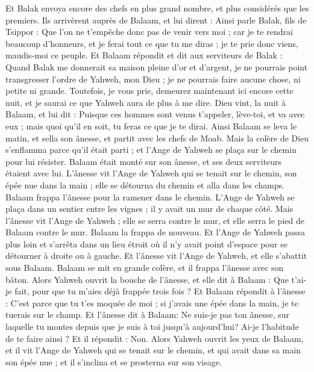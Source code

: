 \begin{multicols}{2}
Et Balak envoya encore des chefs en plus grand nombre, et plus considérés que les premiers.
Ils arrivèrent auprès de Balaam, et lui dirent : Ainsi parle Balak, fils de Tsippor : Que l'on ne t'empêche donc pas de venir vers moi ;
car je te rendrai beaucoup d'honneurs, et je ferai tout ce que tu me diras ; je te prie donc viens, maudis-moi ce peuple.
Et Balaam répondit et dit aux serviteurs de Balak : Quand Balak me donnerait sa maison pleine d'or et d'argent, je ne pourrais point transgresser l'ordre de Yahweh, mon Dieu ; je ne pourrais faire aucune chose, ni petite ni grande.
Toutefois, je vous prie, demeurez maintenant ici encore cette nuit, et je saurai ce que Yahweh aura de plus à me dire.
Dieu vint, la nuit à Balaam, et lui dit : Puisque ces hommes sont venus t'appeler, lève-toi, et va avec eux ; mais quoi qu'il en soit, tu feras ce que je te dirai.
Ainsi Balaam se leva le matin, et sella son ânesse, et partit avec les chefs de Moab.
Mais la colère de Dieu s'enflamma parce qu'il était parti ; et l'Ange de Yahweh se plaça sur le chemin pour lui résister. Balaam était monté sur son ânesse, et ses deux serviteurs étaient avec lui.
L'ânesse vit l'Ange de Yahweh qui se tenait sur le chemin, son épée nue dans la main ; elle se détourna du chemin et alla dans les champs. Balaam frappa l'ânesse pour la ramener dans le chemin.
L'Ange de Yahweh se plaça dans un sentier entre les vignes ; il y avait un mur de chaque côté.
Mais l'ânesse vit l'Ange de Yahweh ; elle se serra contre le mur, et elle serra le pied de Balaam contre le mur. Balaam la frappa de nouveau.
Et l'Ange de Yahweh passa plus loin et s'arrêta dans un lieu étroit où il n'y avait point d'espace pour se détourner à droite ou à gauche.
Et l'ânesse vit l'Ange de Yahweh, et elle s'abattit sous Balaam. Balaam se mit en grande colère, et il frappa l'ânesse avec son bâton.
Alors Yahweh ouvrit la bouche de l'ânesse, et elle dit à Balaam : Que t'ai-je fait, pour que tu m'aies déjà frappée trois fois ?
Et Balaam répondit à l'ânesse : C'est parce que tu t'es moquée de moi ; si j'avais une épée dans la main, je te tuerais sur le champ.
Et l'ânesse dit à Balaam: Ne suis-je pas ton ânesse, sur laquelle tu montes depuis que je suis à toi jusqu'à aujourd'hui? Ai-je l'habitude de te faire ainsi ? Et il répondit : Non.
Alors Yahweh ouvrit les yeux de Balaam, et il vit l'Ange de Yahweh qui se tenait sur le chemin, et qui avait dans sa main son épée nue ; et il s'inclina et se prosterna sur son visage.

\end{multicols}
